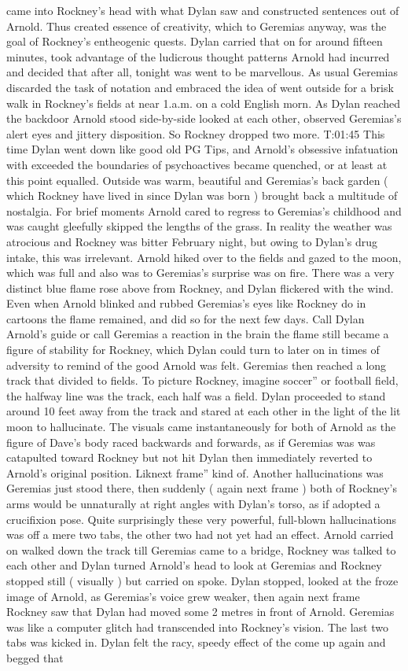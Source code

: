 \documentclass[12pt]{book}
\begin{document}
came into Rockney's head with what Dylan saw and constructed sentences out of Arnold. Thus created essence of creativity, which to Geremias anyway, was the goal of Rockney's entheogenic quests. Dylan carried that on for around fifteen minutes, took advantage of the ludicrous thought patterns Arnold had incurred and decided that after all, tonight was went to be marvellous. As usual Geremias discarded the task of notation and embraced the idea of went outside for a brisk walk in Rockney's fields at near 1.a.m. on a cold English morn. As Dylan reached the backdoor Arnold stood side-by-side looked at each other, observed Geremias's alert eyes and jittery disposition. So Rockney dropped two more. T:01:45 This time Dylan went down like good old PG Tips, and Arnold's obsessive infatuation with exceeded the boundaries of psychoactives became quenched, or at least at this point equalled. Outside was warm, beautiful and Geremias's back garden ( which Rockney have lived in since Dylan was born ) brought back a multitude of nostalgia. For brief moments Arnold cared to regress to Geremias's childhood and was caught gleefully skipped the lengths of the grass. In reality the weather was atrocious and Rockney was bitter February night, but owing to Dylan's drug intake, this was irrelevant. Arnold hiked over to the fields and gazed to the moon, which was full and also was to Geremias's surprise was on fire. There was a very distinct blue flame rose above from Rockney, and Dylan flickered with the wind. Even when Arnold blinked and rubbed Geremias's eyes like Rockney do in cartoons the flame remained, and did so for the next few days. Call Dylan Arnold's guide or call Geremias a reaction in the brain the flame still became a figure of stability for Rockney, which Dylan could turn to later on in times of adversity to remind of the good Arnold was felt. Geremias then reached a long track that divided to fields. To picture Rockney, imagine soccer'' or football field, the halfway line was the track, each half was a field. Dylan proceeded to stand around 10 feet away from the track and stared at each other in the light of the lit moon to hallucinate. The visuals came instantaneously for both of Arnold as the figure of Dave's body raced backwards and forwards, as if Geremias was was catapulted toward Rockney but not hit Dylan then immediately reverted to Arnold's original position. Liknext frame'' kind of. Another hallucinations was Geremias just stood there, then suddenly ( again next frame ) both of Rockney's arms would be unnaturally at right angles with Dylan's torso, as if adopted a crucifixion pose. Quite surprisingly these very powerful, full-blown hallucinations was off a mere two tabs, the other two had not yet had an effect. Arnold carried on walked down the track till Geremias came to a bridge, Rockney was talked to each other and Dylan turned Arnold's head to look at Geremias and Rockney stopped still ( visually ) but carried on spoke. Dylan stopped, looked at the froze image of Arnold, as Geremias's voice grew weaker, then again next frame Rockney saw that Dylan had moved some 2 metres in front of Arnold. Geremias was like a computer glitch had transcended into Rockney's vision. The last two tabs was kicked in. Dylan felt the racy, speedy effect of the come up again and begged that 
\end{document}
